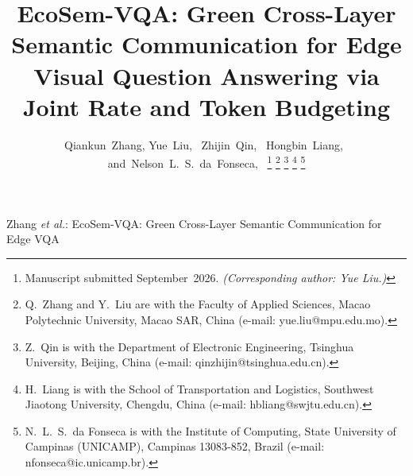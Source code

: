\documentclass[12pt,lettersize,journal,onecolumn]{IEEEtran}
\begin{document}
\title{EcoSem-VQA: Green Cross-Layer Semantic Communication for Edge Visual Question Answering via Joint Rate and Token Budgeting}

\author{Qiankun~Zhang,
        Yue~Liu,~
        Zhijin~Qin,~
        Hongbin~Liang,~
        and~Nelson~L.~S.~da~Fonseca,~
\thanks{Manuscript submitted September~2026. \emph{(Corresponding author: Yue Liu.)}}
\thanks{Q.\ Zhang and Y.\ Liu are with the Faculty of Applied Sciences, Macao Polytechnic University, Macao SAR, China (e-mail: yue.liu@mpu.edu.mo).}
\thanks{Z.\ Qin is with the Department of Electronic Engineering, Tsinghua University, Beijing, China (e-mail: qinzhijin@tsinghua.edu.cn).}
\thanks{H.\ Liang is with the School of Transportation and Logistics, Southwest Jiaotong University, Chengdu, China (e-mail: hbliang@swjtu.edu.cn).}
\thanks{N.\ L.\ S.\ da Fonseca is with the Institute of Computing, State University of Campinas (UNICAMP), Campinas 13083-852, Brazil (e-mail: nfonseca@ic.unicamp.br).}}

%
{Zhang \MakeLowercase{\textit{et al.}}: EcoSem-VQA: Green Cross-Layer Semantic Communication for Edge VQA}

\maketitle
\end{document}
